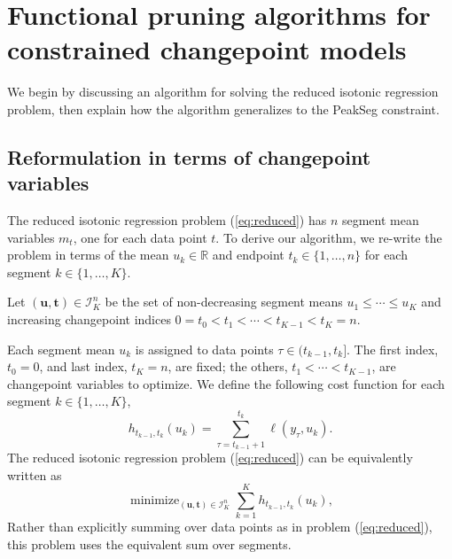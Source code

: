 \documentclass[twoside,11pt]{article}
\DeclareMathOperator*{\minimize}{minimize}
\newcommand{\RR}{\mathbb R}
\begin{document}
\newcommand{\FCC}{C}
\newcommand{\M}{\mathcal{M}}
\section{Functional 
pruning algorithms for constrained
  changepoint models}
\label{sec:algorithms}



We begin by discussing an algorithm for solving the reduced isotonic
regression problem, then explain how the algorithm generalizes to
the PeakSeg constraint.

\subsection{Reformulation in terms of changepoint variables}

The reduced isotonic regression problem (\ref{eq:reduced}) has $n$
segment mean variables $m_t$, one for each data point $t$. To derive
our algorithm, we re-write the problem in terms of the mean
$u_k\in\RR$ and endpoint $t_k\in\{1,\dots,n\}$ for each
segment $k\in\{1,\dots, K\}$.
\begin{definition}
\label{def:Ibar}
  Let $(\mathbf u, \mathbf t)\in{\mathcal I}^n_K$ be the set of
  non-decreasing segment means $u_1\leq\cdots\leq u_K$ and
  increasing changepoint indices $0=t_0<t_1<\cdots<t_{K-1}<t_K=n$.
\end{definition}
Each segment mean $u_k$ is assigned to data points
$\tau\in(t_{k-1},t_k]$. The first index, $t_0=0$, and last index,
$t_K=n$, are fixed; the others, $t_1<\cdots<t_{K-1}$, are
changepoint variables to optimize. We define the following cost function for each
segment $k\in\{1, \dots, K\}$,
\begin{equation}
  \label{eq:h}
  h_{t_{k-1}, t_k}(u_k) = \sum_{\tau=t_{k-1}+1}^{t_k} \ell(y_\tau, u_k).
\end{equation}
The reduced isotonic regression problem (\ref{eq:reduced}) can be equivalently written as
\begin{equation}
  \label{eq:isotonic_ut}
  \minimize_{(\mathbf u, \mathbf t)\in{\mathcal I}^n_K}
  \sum_{k=1}^K
  h_{t_{k-1}, t_k}(u_k),
\end{equation}
Rather than explicitly summing over data points as in problem
(\ref{eq:reduced}), this problem uses the equivalent sum over segments. 
\end{document}
